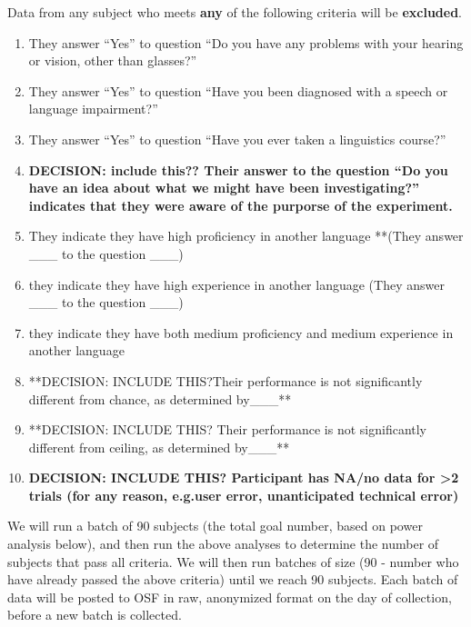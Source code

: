 \documentclass[]{article}
\providecommand{\tightlist}{%
  \setlength{\itemsep}{0pt}\setlength{\parskip}{0pt}}
\begin{document}
Data from any subject who meets \textbf{any} of the following criteria
will be \textbf{excluded}.

\begin{enumerate}
\def\labelenumi{\arabic{enumi})}
\tightlist
\item
  They answer ``Yes'' to question ``Do you have any problems with your
  hearing or vision, other than glasses?''
\item
  They answer ``Yes'' to question ``Have you been diagnosed with a
  speech or language impairment?''
\item
  They answer ``Yes'' to question ``Have you ever taken a linguistics
  course?''
\item
  \textbf{DECISION: include this?? Their answer to the question ``Do you
  have an idea about what we might have been investigating?'' indicates
  that they were aware of the purporse of the experiment.}
\item
  They indicate they have high proficiency in another language **(They
  answer \_\_\_ to the question \_\_\_)
\item
  they indicate they have high experience in another language (They
  answer \_\_\_ to the question \_\_\_)\\
\item
  they indicate they have both medium proficiency and medium experience
  in another language\\
\item
  **DECISION: INCLUDE THIS?Their performance is not significantly
  different from chance, as determined by\_\_\_**\\
\item
  **DECISION: INCLUDE THIS? Their performance is not significantly
  different from ceiling, as determined by\_\_\_**\\
\item
  \textbf{DECISION: INCLUDE THIS? Participant has NA/no data for
  \textgreater{}2 trials (for any reason, e.g.user error, unanticipated
  technical error)}
\end{enumerate}

We will run a batch of 90 subjects (the total goal number, based on
power analysis below), and then run the above analyses to determine the
number of subjects that pass all criteria. We will then run batches of
size (90 - number who have already passed the above criteria) until we
reach 90 subjects. Each batch of data will be posted to OSF in raw,
anonymized format on the day of collection, before a new batch is
collected.
\end{document}
